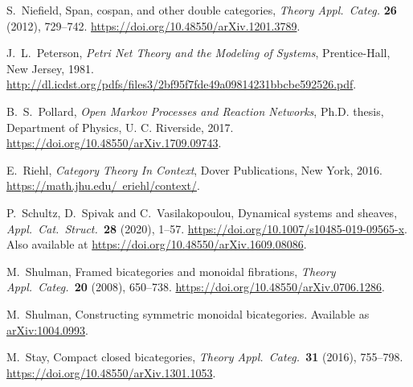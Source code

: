 \documentclass[a4paper,onecolumn, superscriptaddress,10pt, accepted=2022-03-25, issue=SS, volume=VV, shorttitle=papers/compositionality-VV-SS]{compositionalityarticle}
\begin{document}
\begin{thebibliography}{100}
 S.~Niefield, Span, cospan, and other double categories, \textsl{Theory Appl.\ Categ.} \textbf{26} (2012), 729--742.  \href{https://doi.org/10.48550/arXiv.1201.3789}{https://doi.org/10.48550/arXiv.1201.3789}.

 J.\ L.\ Peterson, \textit{Petri Net Theory and the Modeling of Systems}, Prentice-Hall, New Jersey, 1981. \href{http://dl.icdst.org/pdfs/files3/2bf95f7fde49a09814231bbcbe592526.pdf}{http://dl.icdst.org/pdfs/files3/2bf95f7fde49a09814231bbcbe592526.pdf}.

 B.\ S.\ Pollard, \textsl{Open Markov Processes and Reaction Networks}, Ph.D. thesis, Department of Physics, U. C. Riverside, 2017. \href{https://doi.org/10.48550/arXiv.1709.09743}{https://doi.org/10.48550/arXiv.1709.09743}.



 E.\ Riehl, \textsl{Category Theory In Context}, Dover Publications, New York, 2016.  \href{https://math.jhu.edu/~eriehl/context/}{https://math.jhu.edu/~eriehl/context/}.

 P.\ Schultz, D.\ Spivak and C.\ Vasilakopoulou, Dynamical systems and sheaves, \textsl{Appl.\ Cat.\ Struct.\ }\textbf{28} (2020), 1--57. 
\href{https://doi.org/10.1007/s10485-019-09565-x}{https://doi.org/10.1007/s10485-019-09565-x}.  Also available at \href{https://doi.org/10.48550/arXiv.1609.08086}{https://doi.org/10.48550/arXiv.1609.08086}.

 M.\ Shulman, Framed bicategories and monoidal fibrations, \textsl{Theory Appl.\ Categ.\ }\textbf{20} (2008), 650--738.  \href{https://doi.org/10.48550/arXiv.0706.1286}{https://doi.org/10.48550/arXiv.0706.1286}.

 M.\ Shulman, Constructing symmetric monoidal bicategories. Available as \href{http://arxiv.org/abs/1004.0993}{arXiv:1004.0993}.

 M.\ Stay, Compact closed bicategories, \textsl{Theory Appl.\ Categ.\ }\textbf{31} (2016), 755--798.    \href{https://doi.org/10.48550/arXiv.1301.1053}{https://doi.org/10.48550/arXiv.1301.1053}.


\end{thebibliography}
\end{document}
